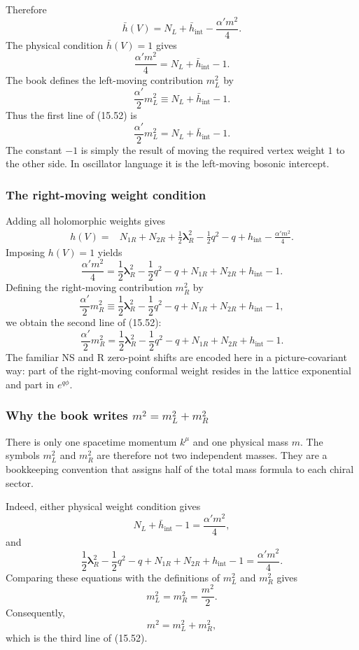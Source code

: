 \documentclass[
  10pt,
  a4paper,
  openany]{book}
\begin{document}
Therefore \[
\bar h(V)
=
N_L+\bar h_{\mathrm{int}}
-\frac{\alpha'm^2}{4}.
\] The physical condition \(\bar h(V)=1\) gives \[
\frac{\alpha'm^2}{4}
=
N_L+\bar h_{\mathrm{int}}-1.
\] The book defines the left-moving contribution \(m_L^2\) by \[
\frac{\alpha'}2m_L^2
\equiv
N_L+\bar h_{\mathrm{int}}-1.
\] Thus the first line of (15.52) is \[
\boxed{
\frac{\alpha'}2m_L^2
=N_L+\bar h_{\mathrm{int}}-1.
}
\] The constant \(-1\) is simply the result of moving the required
vertex weight \(1\) to the other side. In oscillator language it is the
left-moving bosonic intercept.

\subsubsection{The right-moving weight
condition}\label{the-right-moving-weight-condition}

Adding all holomorphic weights gives \[
\begin{aligned}
h(V)
={}&
N_{1R}+N_{2R}
+\frac12\boldsymbol\lambda_R^2
-\frac12q^2-q
+h_{\mathrm{int}}
-\frac{\alpha'm^2}{4}.
\end{aligned}
\] Imposing \(h(V)=1\) yields \[
\frac{\alpha'm^2}{4}
=
\frac12\boldsymbol\lambda_R^2
-\frac12q^2-q
+N_{1R}+N_{2R}
+h_{\mathrm{int}}-1.
\] Defining the right-moving contribution \(m_R^2\) by \[
\frac{\alpha'}2m_R^2
\equiv
\frac12\boldsymbol\lambda_R^2
-\frac12q^2-q
+N_{1R}+N_{2R}
+h_{\mathrm{int}}-1,
\] we obtain the second line of (15.52): \[
\boxed{
\frac{\alpha'}2m_R^2
=
\frac12\boldsymbol\lambda_R^2
-\frac12q^2-q
+N_{1R}+N_{2R}
+h_{\mathrm{int}}-1.
}
\] The familiar NS and R zero-point shifts are encoded here in a
picture-covariant way: part of the right-moving conformal weight resides
in the lattice exponential and part in \(e^{q\phi}\).

\subsubsection{\texorpdfstring{Why the book writes
\(m^2=m_L^2+m_R^2\)}{Why the book writes m\^{}2=m\_L\^{}2+m\_R\^{}2}}\label{why-the-book-writes-m2m_l2m_r2}

There is only one spacetime momentum \(k^\mu\) and one physical mass
\(m\). The symbols \(m_L^2\) and \(m_R^2\) are therefore not two
independent masses. They are a bookkeeping convention that assigns half
of the total mass formula to each chiral sector.

Indeed, either physical weight condition gives \[
N_L+\bar h_{\mathrm{int}}-1
=
\frac{\alpha'm^2}{4},
\] and \[
\frac12\boldsymbol\lambda_R^2
-\frac12q^2-q
+N_{1R}+N_{2R}
+h_{\mathrm{int}}-1
=
\frac{\alpha'm^2}{4}.
\] Comparing these equations with the definitions of \(m_L^2\) and
\(m_R^2\) gives \[
m_L^2=m_R^2=\frac{m^2}{2}.
\] Consequently, \[
\boxed{m^2=m_L^2+m_R^2,}
\] which is the third line of (15.52).
\end{document}
